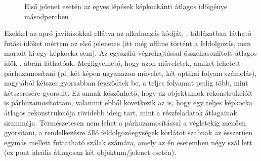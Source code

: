 \begin{figure}[b]
\centering
{}
\caption{Első jelenet esetén az egyes lépések képkockánti átlagos időigénye másodpercben \label{fig:scene1_stats}}
\end{figure}

Ezekkel az apró javításokkal ellátva az alkalmazás kódját, . táblázatban látható futási időket mértem az első jelenetre (itt még offline történt a feldolgozás, nem maradt ki egy képkocka sem). Az egyszálú végrehajtással összehasonlított átlagos idők . ábrán láthatóak. Megfigyelhető, hogy azon műveletek, amiket lehetett párhuzamosítani (pl. két képen ugyanazon művelet, két optikai folyam számolás), nagyjából kétszer gyorsabban fejeződtek be, a teljes folyamat pedig több, mint kétszeresére gyorsult. Ez annak köszönhető, hogy az objektumok rekonstrukcióit is párhuzamosítottam, valamint ebből következik az is, hogy egy teljes képkocka átlagos rekonstrukciója rövidebb ideig tart, mint a részfeladatok átlagainak szummája. Természetesen nem lehet a párhuzamosítással a végletekig menően gyorsítani, a rendelkezésre álló feldolgozóegységek korlátot szabnak az ésszerűen egymás mellett futtatható szálak számára, amely az én esetemben négy szál lett (ez pont ideális átlagosan két objektum/jelenet esetén).


